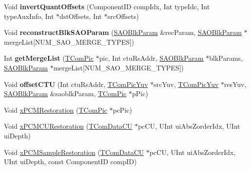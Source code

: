 \begin{DoxyCompactItemize}
Void {\bfseries invert\+Quant\+Offsets} (Component\+ID comp\+Idx, Int type\+Idc, Int type\+Aux\+Info, Int $\ast$dst\+Offsets, Int $\ast$src\+Offsets)
\item 
\mbox{\label{class_t_com_sample_adaptive_offset_afbb74f87435a1369e9699de17615c308}} 
Void {\bfseries reconstruct\+Blk\+S\+A\+O\+Param} (\hyperlink{struct_s_a_o_blk_param}{S\+A\+O\+Blk\+Param} \&rec\+Param, \hyperlink{struct_s_a_o_blk_param}{S\+A\+O\+Blk\+Param} $\ast$merge\+List\mbox{[}N\+U\+M\+\_\+\+S\+A\+O\+\_\+\+M\+E\+R\+G\+E\+\_\+\+T\+Y\+P\+ES\mbox{]})
\item 
\mbox{\label{class_t_com_sample_adaptive_offset_a0ba9fc7a190e1e33c5bc63c35c1cc074}} 
Int {\bfseries get\+Merge\+List} (\hyperlink{class_t_com_pic}{T\+Com\+Pic} $\ast$pic, Int ctu\+Rs\+Addr, \hyperlink{struct_s_a_o_blk_param}{S\+A\+O\+Blk\+Param} $\ast$blk\+Params, \hyperlink{struct_s_a_o_blk_param}{S\+A\+O\+Blk\+Param} $\ast$merge\+List\mbox{[}N\+U\+M\+\_\+\+S\+A\+O\+\_\+\+M\+E\+R\+G\+E\+\_\+\+T\+Y\+P\+ES\mbox{]})
\item 
\mbox{\label{class_t_com_sample_adaptive_offset_a6b56324a04ebbc6bfaf69c061c48a291}} 
Void {\bfseries offset\+C\+TU} (Int ctu\+Rs\+Addr, \hyperlink{class_t_com_pic_yuv}{T\+Com\+Pic\+Yuv} $\ast$src\+Yuv, \hyperlink{class_t_com_pic_yuv}{T\+Com\+Pic\+Yuv} $\ast$res\+Yuv, \hyperlink{struct_s_a_o_blk_param}{S\+A\+O\+Blk\+Param} \&saoblk\+Param, \hyperlink{class_t_com_pic}{T\+Com\+Pic} $\ast$p\+Pic)
\item 
Void \hyperlink{class_t_com_sample_adaptive_offset_a70a2ba8bc06c8508a5a22b8158e4be03}{x\+P\+C\+M\+Restoration} (\hyperlink{class_t_com_pic}{T\+Com\+Pic} $\ast$pc\+Pic)
\item 
Void \hyperlink{class_t_com_sample_adaptive_offset_a64607aac63f53c0c2a8ef083a7cb97a4}{x\+P\+C\+M\+C\+U\+Restoration} (\hyperlink{class_t_com_data_c_u}{T\+Com\+Data\+CU} $\ast$pc\+CU, U\+Int ui\+Abs\+Zorder\+Idx, U\+Int ui\+Depth)
\item 
Void \hyperlink{class_t_com_sample_adaptive_offset_a3051d1ba9e192dbc222906db2f6a4430}{x\+P\+C\+M\+Sample\+Restoration} (\hyperlink{class_t_com_data_c_u}{T\+Com\+Data\+CU} $\ast$pc\+CU, U\+Int ui\+Abs\+Zorder\+Idx, U\+Int ui\+Depth, const Component\+ID comp\+ID)
\end{DoxyCompactItemize}


